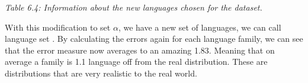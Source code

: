 {\it \footnotesize Table 6.4: Information about the new languages chosen for the dataset.}

\noindent With this modification to set $\alpha$, we have a new set of languages, we can call language set . By calculating the errors again for each language family, we can see that the error measure now averages to an amazing 1.83. Meaning that on average a family is 1.1 language off from the real distribution. These are distributions that are very realistic to the real world. 

\vspace{0.3cm}

